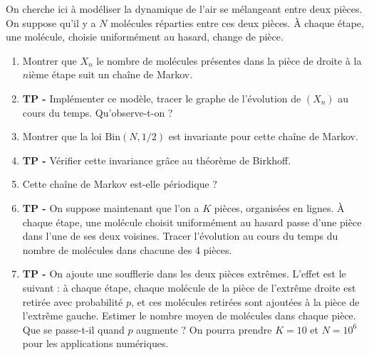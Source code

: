 \documentclass[solutions]{exercices}
\begin{document}
\begin{exercice}
	On cherche ici à modéliser la dynamique de l'air se mélangeant entre deux pièces. On suppose qu'il y a $N$ molécules réparties entre ces deux pièces. À chaque étape, une molécule, choisie uniformément au hasard, change de pièce.
	\begin{enumerate}
		\item Montrer que $X_n$ le nombre de molécules présentes dans la pièce de droite à la $n$ième étape suit un chaîne de Markov.
		\item \textbf{TP -} Implémenter ce modèle, tracer le graphe de l'évolution de $(X_n)$ au cours du temps. Qu'observe-t-on ?
		\item Montrer que la loi $\mathrm{Bin}(N,1/2)$ est invariante pour cette chaîne de Markov.
		\item \textbf{TP -} Vérifier cette invariance grâce au théorème de Birkhoff.
		\item Cette chaîne de Markov est-elle périodique ?
		\item \textbf{TP -} On suppose maintenant que l'on a $K$ pièces, organisées en lignes. À chaque étape, une molécule choisit uniformément au hasard passe d'une pièce dans l'une de ses deux voisines. Tracer l'évolution au cours du temps du nombre de molécules dans chacune des 4 pièces.
		\item \textbf{TP -} On ajoute une soufflerie dans les deux pièces extrêmes. L'effet est le suivant : à chaque étape, chaque molécule de la pièce de l'extrême droite est retirée avec probabilité $p$, et ces molécules retirées sont ajoutées à la pièce de l'extrême gauche. Estimer le nombre moyen de molécules dans chaque pièce. Que se passe-t-il quand $p$ augmente ? On pourra prendre $K = 10$ et $N = 10^6$ pour les applications numériques.
	\end{enumerate}
\end{exercice}
\end{document}
